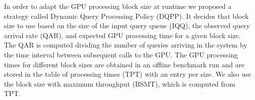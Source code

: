 %

In order to adapt the GPU processing block size at runtime we proposed a strategy called Dynamic 
Query Processing Policy (DQPP). It decides that block size to use based on the 
size of the input query queue (IQQ), the observed query arrival rate (QAR), and expected GPU processing time for a given block size. The QAR is computed dividing the number of 
queries arriving in the system by the time interval between subsequent calls to 
the GPU. The GPU processing times for different block sizes are obtained in an 
offline benchmark run and are stored in the table of processing times (TPT) with an 
entry per size. We also use the block size with maximum throughput (BSMT), which
is computed from TPT.



